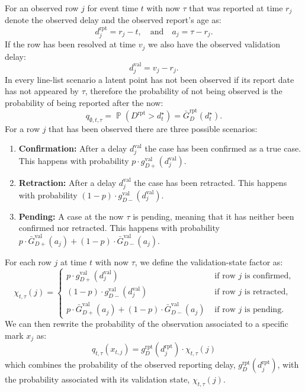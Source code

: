 \documentclass{article}
\theoremstyle{definition}
\theoremstyle{remark}
\newcommand{\Prb}{\operatorname{\mathbb{P}}}
\begin{document}
For an observed row $j$ for event time $t$ with now $\tau$ that was reported at time $r_j$ denote the observed delay and the observed report's age as:
\begin{equation}
    d_j^{\text{rpt}} = r_j - t, \quad \text{and} \quad a_j = \tau - r_j.
\end{equation}
If the row has been resolved at time $v_j$ we also have the observed validation delay:
\begin{equation}
d_j^{\text{val}} = v_j - r_j.
\end{equation}
In every line-list scenario a latent point has not been observed if its report date has not appeared by $\tau$, therefore the probability of not being observed is the probability of being reported after the now:
\begin{equation}
    q_{\emptyset, t, \tau} 
    = \Prb(D^{\text{rpt}} > d_t^{\star}) 
    = \bar{G}_D^{\text{rpt}}(d_t^{\star}).
\end{equation}
For a row $j$ that has been observed there are three possible scenarios:
\begin{enumerate}
    \item \textbf{Confirmation:} After a delay $d_j^{\text{val}}$ the case has been confirmed as a true case. This happens with probability $p \cdot g_{D+}^{\text{val}}(d_j^{\text{val}})$.
    \item \textbf{Retraction:} After a delay $d_j^{\text{val}}$ the case has been retracted. This happens with probability $(1 -p) \cdot g_{D-}^{\text{val}}(d_j^{\text{val}})$.
    \item \textbf{Pending:} A case at the now $\tau$ is pending, meaning that it has neither been confirmed nor retracted. This happens with probability $p \cdot \bar{G}_{D+}^{\text{val}}(a_j) + (1 - p) \cdot \bar{G}_{D-}^{\text{val}}(a_j)$.
\end{enumerate}
For each row $j$ at time $t$ with now $\tau$, we define the validation-state factor as:
\begin{equation}\label{chilinelist}
    \chi_{t,\tau}(j) = \begin{cases}
        p \cdot g_{D+}^{\text{val}}(d_j^{\text{val}}) & \text{ if row } j \text{ is confirmed,} \\
        (1 -p) \cdot g_{D-}^{\text{val}}(d_j^{\text{val}}) & \text{ if row } j \text{ is retracted,} \\
        p \cdot \bar{G}_{D+}^{\text{val}}(a_j) + (1 - p) \cdot \bar{G}_{D-}^{\text{val}}(a_j) & \text{ if row } j \text{ is pending.} 
    \end{cases}
\end{equation}
We can then rewrite the probability of the observation associated to a specific mark $x_j$ as:
\begin{equation}\label{qlinelist}
    q_{t,\tau}(x_{t,j}) = g_{D}^{\text{rpt}} (d^{\text{rpt}}_j)  \cdot \chi_{t,\tau}(j)
\end{equation}
which combines the probability of the observed reporting delay, $g_{D}^{\text{rpt}} (d^{\text{rpt}}_j)$, with the probability associated with its validation state, $\chi_{t,\tau}(j)$. 
\end{document}
